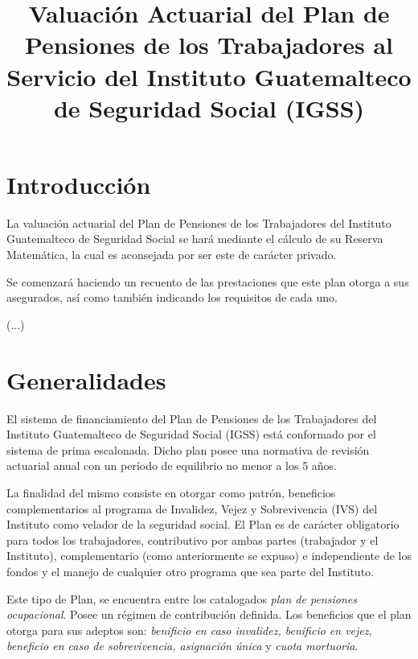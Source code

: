 \documentclass[12pt,letterpaper,titlepage]{article}
\title{Valuación Actuarial del Plan de Pensiones de los Trabajadores al Servicio del Instituto Guatemalteco de Seguridad Social (IGSS)}
\begin{document}
\begin{titlepage}
	\renewcommand{\thepage}{}
	\pagestyle{empty}
	\maketitle
\end{titlepage}\newpage
\setcounter{page}{2}
\tableofcontents
\newpage
\nocite{*}
\section{Introducción}

La valuación actuarial del Plan de Pensiones de los Trabajadores del Instituto Guatemalteco de Seguridad Social se hará mediante el cálculo de su Reserva Matemática, la cual es aconsejada por ser este de carácter privado.

Se comenzará haciendo un recuento de las prestaciones que este plan otorga a sus asegurados, así como también indicando los requisitos de cada uno.

(...)

\section{Generalidades}

El sistema de financiamiento del Plan de Pensiones de los Trabajadores del Instituto Guatemalteco de Seguridad Social (IGSS) está conformado por el sistema de prima escalonada. Dicho plan posee una normativa de revisión actuarial anual con un período de equilibrio no menor a los 5 años. 

La finalidad del mismo consiste en otorgar como patrón, beneficios complementarios al programa de Invalidez, Vejez y Sobrevivencia (IVS) del Instituto como velador de la seguridad social. El Plan es de carácter obligatorio para todos los trabajadores, contributivo por ambas partes (trabajador y el Instituto), complementario (como anteriormente se expuso) e independiente de los fondos y el manejo de cualquier otro programa que sea parte del Instituto.

Este tipo de Plan, se encuentra entre los catalogados \textit{plan de pensiones ocupacional}. Posee un régimen de contribución definida. Los beneficios que el plan otorga para sus adeptos son: \textit{benificio en caso invalidez, benificio en vejez, beneficio en caso de sobrevivencia, asignación única} y \textit{cuota mortuoria}.
\end{document}

